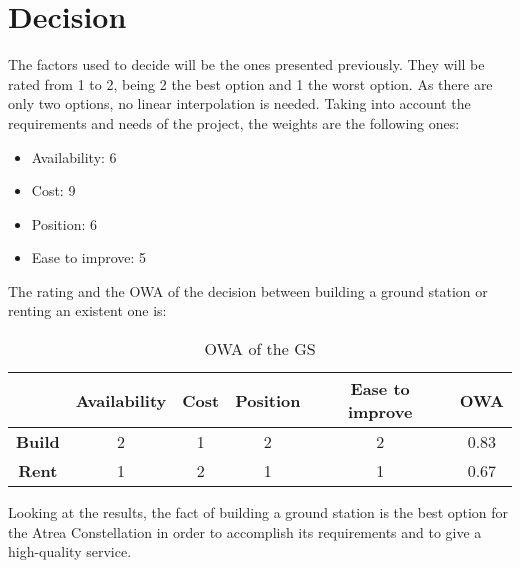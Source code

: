 \section{Decision}
The factors used to decide will be the ones presented previously. They will be rated from 1 to 2, being 2 the best option and 1 the worst option. As there are only two options, no linear interpolation is needed. Taking into account the requirements and needs of the project, the weights are the following ones:
\begin{itemize}
\item Availability: 6
\item Cost: 9
\item Position: 6 
\item Ease to improve: 5
\end{itemize}
The rating and the OWA of the decision between building a ground station or renting an existent one is:
\begin{table}[H]
\begin{center}
\begin{tabular}{|c|c|c|c|c|c|}
\hline
&\textbf{Availability}&\textbf{Cost}&\textbf{Position}&\textbf{Ease to improve}&\textbf{OWA}\\
\hline
\textbf{Build}&2&1&2&2&0.83\\
\hline
\textbf{Rent}&1&2&1&1&0.67\\
\hline
\end{tabular}
\caption{OWA of the GS}
\end{center}
\end{table}
Looking at the results, the fact of building a ground station is the best option for the Atrea Constellation in order to accomplish its requirements and to give a high-quality service.
